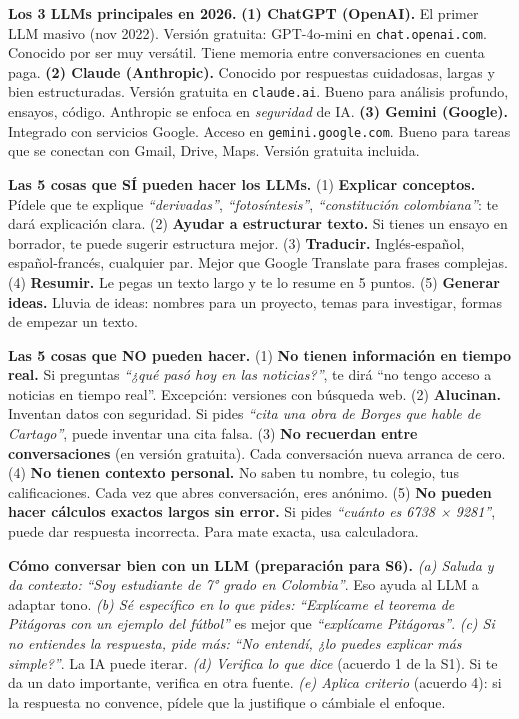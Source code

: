 \documentclass[11pt,letterpaper]{article}
\newcommand{\milcpaso}[3]{%
\Needspace{4\baselineskip}%
\begin{tcolorbox}[enhanced,colback=white,colframe=milcLinea,arc=1.5mm,boxrule=.9pt,
  left=14mm,right=4mm,top=3mm,bottom=3mm,before skip=4pt,after skip=4pt,
  fontupper=\RaggedRight,
  overlay={\node[anchor=north west,circle,fill=#2,text=white,inner sep=0pt,
    minimum size=7.4mm,font=\sffamily\bfseries\small]
    at ([xshift=3.6mm,yshift=-3.2mm]frame.north west) {#1};}]
#3
\end{tcolorbox}}
\begin{document}
\milcpaso{1}{milcTurquesa}{\textbf{Los 3 LLMs principales en 2026.} \textbf{(1) ChatGPT (OpenAI).} El primer LLM masivo (nov 2022). Versión gratuita: GPT-4o-mini en \texttt{chat.openai.com}. Conocido por ser muy versátil. Tiene memoria entre conversaciones en cuenta paga. \textbf{(2) Claude (Anthropic).} Conocido por respuestas cuidadosas, largas y bien estructuradas. Versión gratuita en \texttt{claude.ai}. Bueno para análisis profundo, ensayos, código. Anthropic se enfoca en \emph{seguridad} de IA. \textbf{(3) Gemini (Google).} Integrado con servicios Google. Acceso en \texttt{gemini.google.com}. Bueno para tareas que se conectan con Gmail, Drive, Maps. Versión gratuita incluida.}
\milcpaso{2}{milcTurquesa}{\textbf{Las 5 cosas que SÍ pueden hacer los LLMs.} (1) \textbf{Explicar conceptos.} Pídele que te explique \emph{``derivadas''}, \emph{``fotosíntesis''}, \emph{``constitución colombiana''}: te dará explicación clara. (2) \textbf{Ayudar a estructurar texto.} Si tienes un ensayo en borrador, te puede sugerir estructura mejor. (3) \textbf{Traducir.} Inglés-español, español-francés, cualquier par. Mejor que Google Translate para frases complejas. (4) \textbf{Resumir.} Le pegas un texto largo y te lo resume en 5 puntos. (5) \textbf{Generar ideas.} Lluvia de ideas: nombres para un proyecto, temas para investigar, formas de empezar un texto.}
\milcpaso{3}{milcTurquesa}{\textbf{Las 5 cosas que NO pueden hacer.} (1) \textbf{No tienen información en tiempo real.} Si preguntas \emph{``¿qué pasó hoy en las noticias?''}, te dirá ``no tengo acceso a noticias en tiempo real''. Excepción: versiones con búsqueda web. (2) \textbf{Alucinan.} Inventan datos con seguridad. Si pides \emph{``cita una obra de Borges que hable de Cartago''}, puede inventar una cita falsa. (3) \textbf{No recuerdan entre conversaciones} (en versión gratuita). Cada conversación nueva arranca de cero. (4) \textbf{No tienen contexto personal.} No saben tu nombre, tu colegio, tus calificaciones. Cada vez que abres conversación, eres anónimo. (5) \textbf{No pueden hacer cálculos exactos largos sin error.} Si pides \emph{``cuánto es 6738 × 9281''}, puede dar respuesta incorrecta. Para mate exacta, usa calculadora.}
\milcpaso{4}{milcTurquesa}{\textbf{Cómo conversar bien con un LLM (preparación para S6).} \emph{(a) Saluda y da contexto:} \emph{``Soy estudiante de 7° grado en Colombia''}. Eso ayuda al LLM a adaptar tono. \emph{(b) Sé específico en lo que pides:} \emph{``Explícame el teorema de Pitágoras con un ejemplo del fútbol''} es mejor que \emph{``explícame Pitágoras''}. \emph{(c) Si no entiendes la respuesta, pide más:} \emph{``No entendí, ¿lo puedes explicar más simple?''}. La IA puede iterar. \emph{(d) Verifica lo que dice} (acuerdo 1 de la S1). Si te da un dato importante, verifica en otra fuente. \emph{(e) Aplica criterio} (acuerdo 4): si la respuesta no convence, pídele que la justifique o cámbiale el enfoque.}
\end{document}
